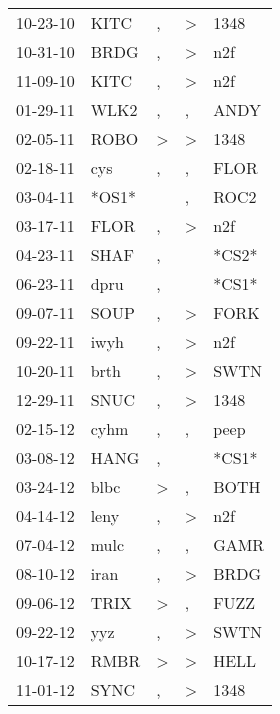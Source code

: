 \begin{supertabular}{lllll}
 10-23-10 &   KITC &                , &     \textgreater &   1348 \\
 10-31-10 &   BRDG &                , &     \textgreater &    n2f \\
 11-09-10 &   KITC &                , &     \textgreater &    n2f \\
 01-29-11 &   WLK2 &                , &                , &   ANDY \\
 02-05-11 &   ROBO &     \textgreater &     \textgreater &   1348 \\
 02-18-11 &    cys &                , &                , &   FLOR \\
 03-04-11 &  *OS1* &                  &                , &   ROC2 \\
 03-17-11 &   FLOR &                , &     \textgreater &    n2f \\
 04-23-11 &   SHAF &                , &                  &  *CS2* \\
 06-23-11 &   dpru &                , &                  &  *CS1* \\
 09-07-11 &   SOUP &                , &     \textgreater &   FORK \\
 09-22-11 &   iwyh &                , &     \textgreater &    n2f \\
 10-20-11 &   brth &                , &     \textgreater &   SWTN \\
 12-29-11 &   SNUC &                , &     \textgreater &   1348 \\
 02-15-12 &   cyhm &                , &                , &   peep \\
 03-08-12 &   HANG &                , &                  &  *CS1* \\
 03-24-12 &   blbc &     \textgreater &                , &   BOTH \\
 04-14-12 &   leny &                , &     \textgreater &    n2f \\
 07-04-12 &   mulc &                , &                , &   GAMR \\
 08-10-12 &   iran &                , &     \textgreater &   BRDG \\
 09-06-12 &   TRIX &     \textgreater &                , &   FUZZ \\
 09-22-12 &    yyz &                , &     \textgreater &   SWTN \\
 10-17-12 &   RMBR &     \textgreater &     \textgreater &   HELL \\
 11-01-12 &   SYNC &                , &     \textgreater &   1348 \\

\end{supertabular}
